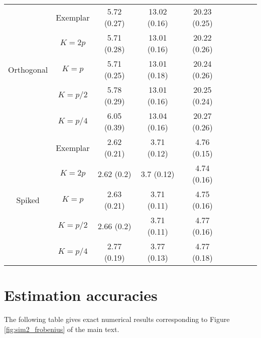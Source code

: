 \documentclass[useAMS,referee,usenatbib]{biom}
\begin{document}
\begin{table}[H]
{\begin{tabular}{ccccccccc}
\multirow{5}{*}{Orthogonal} & Exemplar & 5.72 (0.27) & 13.02 (0.16) & 20.23 (0.25) \\
&$K = 2p$    & 5.71 (0.28) & 13.01 (0.16) & 20.22 (0.26) \\
&$K = p$    & 5.71 (0.25) & 13.01 (0.18) & 20.24 (0.26) \\
&$K = p / 2$  & 5.78 (0.29) & 13.01 (0.16) & 20.25 (0.24) \\
&$K = p/4$ & 6.05 (0.39) & 13.04 (0.16) & 20.27 (0.26)\\ \midrule
\multirow{5}{*}{Spiked} &Exemplar & 2.62 (0.21) & 3.71 (0.12) & 4.76 (0.15) \\
&$K = 2p$     & 2.62 (0.2)  & 3.7 (0.12)  & 4.74 (0.16) \\
&$K = p$     & 2.63 (0.21) & 3.71 (0.11) & 4.75 (0.16) \\
&$K = p / 2$   & 2.66 (0.2)  & 3.71 (0.11) & 4.77 (0.16) \\
&$K = p/4$  & 2.77 (0.19) & 3.77 (0.13) & 4.77 (0.18)\\ \bottomrule
\end{tabular}%
}
\end{table}

\section{Estimation accuracies}

The following table gives exact numerical results corresponding to Figure \ref{fig:sim2_frobenius} of the main text.
\end{document}

